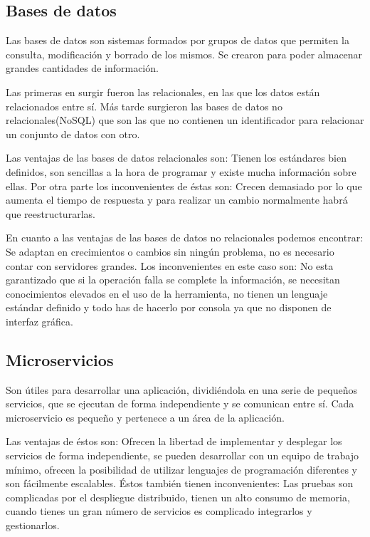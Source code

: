 \documentclass[12pt]{report} %
\begin{document}
	\subsection{Bases de datos}
	Las bases de datos son sistemas formados por grupos de datos que permiten la consulta, modificación y borrado de los mismos. Se crearon para poder almacenar grandes cantidades de información. 

	Las primeras en surgir fueron las relacionales, en las que los datos están relacionados entre sí.
	Más tarde surgieron las bases de datos no relacionales(NoSQL) que son las que no contienen un identificador para relacionar un conjunto de datos con otro.	
	
	Las ventajas de las bases de datos relacionales son: Tienen los estándares bien definidos, son sencillas a la hora de programar y existe mucha información sobre ellas. Por otra parte los inconvenientes de éstas son: Crecen demasiado por lo que aumenta el tiempo de respuesta y para realizar un cambio normalmente habrá que reestructurarlas.
	
	En cuanto a las ventajas de las bases de datos no relacionales podemos encontrar: Se adaptan en crecimientos o cambios sin ningún problema, no es necesario contar con servidores grandes. Los inconvenientes en este caso son: No esta garantizado que si la operación falla se complete la información, se necesitan conocimientos elevados en el uso de la herramienta, no tienen un lenguaje estándar definido y todo has de hacerlo por consola ya que no disponen de interfaz gráfica.
	
	\subsection{Microservicios}
	
	Son útiles para desarrollar una aplicación, dividiéndola en una serie de pequeños servicios, que se ejecutan de forma independiente y se comunican entre sí. Cada microservicio es pequeño y pertenece a un área de la aplicación. 
	
	Las ventajas de éstos son: Ofrecen la libertad de implementar y desplegar los servicios de forma independiente, se pueden desarrollar con un equipo de trabajo mínimo, ofrecen la posibilidad de utilizar lenguajes de programación diferentes y son fácilmente escalables. Éstos también tienen inconvenientes: Las pruebas son complicadas por el despliegue distribuido, tienen un alto consumo de memoria, cuando tienes un gran número de servicios es complicado integrarlos y gestionarlos.
\end{document}
